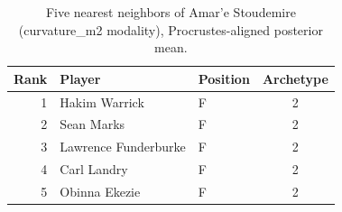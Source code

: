 \begin{table}[htbp]
  \centering\small
  \begin{tabular}{rllc}
    \toprule
    Rank & Player & Position & Archetype \\
    \midrule
    1 & Hakim Warrick & F & 2 \\
    2 & Sean Marks & F & 2 \\
    3 & Lawrence Funderburke & F & 2 \\
    4 & Carl Landry & F & 2 \\
    5 & Obinna Ekezie & F & 2 \\
    \bottomrule
  \end{tabular}
  \caption{Five nearest neighbors of Amar'e Stoudemire (curvature_m2 modality), Procrustes-aligned posterior mean.}
  \label{tab:Amar_e_Stoudemire_neighbors_curvature_m2}
\end{table}

